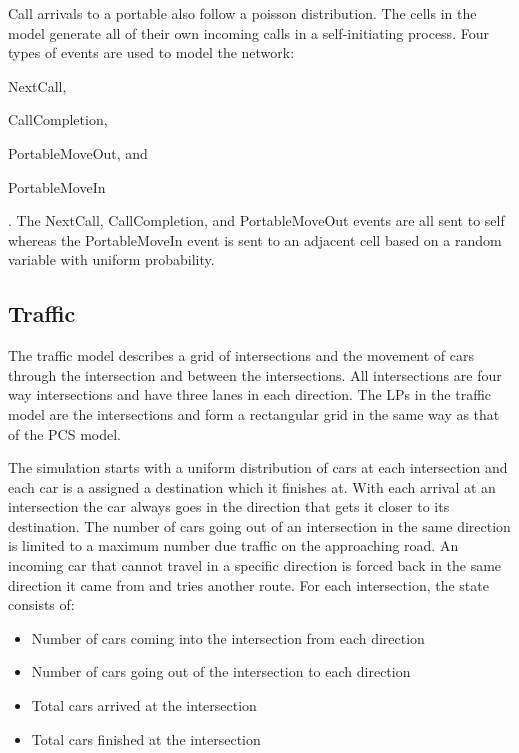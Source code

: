 \documentclass[11pt]{book}
\begin{document}
\noindent
Call arrivals to a portable also follow a poisson distribution. The cells in the model
generate all of their own incoming calls in a self-initiating process.
Four types of events are used to model the network: \begin{inparaenum}[(1)] \item NextCall,
\item CallCompletion, \item PortableMoveOut, and \item PortableMoveIn \end{inparaenum}.
The NextCall, CallCompletion, and PortableMoveOut events are all sent to self whereas
the PortableMoveIn event is sent to an adjacent cell based on a random variable with
uniform probability.

\subsection{Traffic}

The traffic model describes a grid of intersections and the movement of cars through
the intersection and between the intersections. All intersections are four way intersections
and have three lanes in each direction. The LPs in the traffic model are the intersections
and form a rectangular grid in the same way as that of the PCS model.

The simulation starts with a uniform distribution of cars at each intersection and each
car is a assigned a destination which it finishes at. With each arrival at an intersection
the car always goes in the direction that gets it closer to its destination.
The number of cars going out of an intersection in the same direction is limited to a
maximum number due traffic on the approaching road. An incoming car that cannot travel in
a specific direction is forced back in the same direction it came from and tries another
route. For each intersection, the state consists of:

\begin{itemize}
    \item Number of cars coming into the intersection from each direction
    \item Number of cars going out of the intersection to each direction
    \item Total cars arrived at the intersection
    \item Total cars finished at the intersection
\end{itemize}
\end{document}
